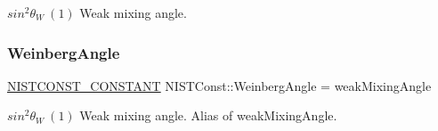 $sin^2 \theta_W \ (1)$ Weak mixing angle. \mbox{\label{group___n_i_s_t_const-_weak_mixing_angle_gae193aad5033858d3f5c0b44f14961458}} 
\subsubsection{\texorpdfstring{Weinberg\+Angle}{WeinbergAngle}}
{\footnotesize\ttfamily \mbox{\hyperlink{group___n_i_s_t_const-_macros_ga2b0fc1d7452373f816175dd86ce26729}{N\+I\+S\+T\+C\+O\+N\+S\+T\+\_\+\+C\+O\+N\+S\+T\+A\+NT}} N\+I\+S\+T\+Const\+::\+Weinberg\+Angle = weak\+Mixing\+Angle}

$sin^2 \theta_W \ (1)$ Weak mixing angle. Alias of weak\+Mixing\+Angle. 